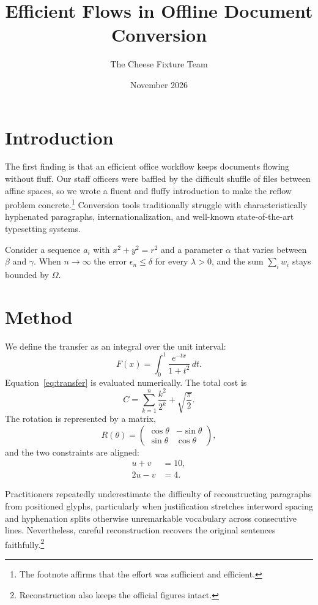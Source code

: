 \documentclass[10pt,twocolumn]{article}
\title{Efficient Flows in Offline Document Conversion}
\author{The Cheese Fixture Team}
\date{November 2026}
\begin{document}
\maketitle
\thispagestyle{fancy}

\section{Introduction}
The first finding is that an efficient office workflow keeps documents flowing without
fluff. Our staff officers were baffled by the difficult shuffle of files between affine
spaces, so we wrote a fluent and fluffy introduction to make the reflow problem
concrete.\footnote{The footnote affirms that the effort was sufficient and efficient.}
Conversion tools traditionally struggle with characteristically hyphenated paragraphs,
internationalization, and well-known state-of-the-art typesetting systems.

Consider a sequence $a_i$ with $x^2 + y^2 = r^2$ and a parameter $\alpha$ that varies
between $\beta$ and $\gamma$. When $n \to \infty$ the error $\epsilon_n \le \delta$ for
every $\lambda > 0$, and the sum $\sum_i w_i$ stays bounded by $\Omega$.

\section{Method}
We define the transfer as an integral over the unit interval:
\begin{equation}
  F(x) = \int_0^1 \frac{e^{-t x}}{1 + t^2} \, dt .
  \label{eq:transfer}
\end{equation}
Equation~\ref{eq:transfer} is evaluated numerically. The total cost is
\begin{equation}
  C = \sum_{k=1}^{n} \frac{k^2}{2^k} + \sqrt{\frac{\pi}{2}} .
\end{equation}
The rotation is represented by a matrix,
\begin{equation}
  R(\theta) = \begin{pmatrix} \cos\theta & -\sin\theta \\ \sin\theta & \cos\theta \end{pmatrix},
\end{equation}
and the two constraints are aligned:
\begin{align}
  u + v &= 10, \\
  2u - v &= 4 .
\end{align}

Practitioners repeatedly underestimate the difficulty of reconstructing paragraphs
from positioned glyphs, particularly when justification stretches interword spacing
and hyphenation splits otherwise unremarkable vocabulary across consecutive lines.
Nevertheless, careful reconstruction recovers the original sentences
faithfully.\footnote{Reconstruction also keeps the official figures intact.}
\end{document}
